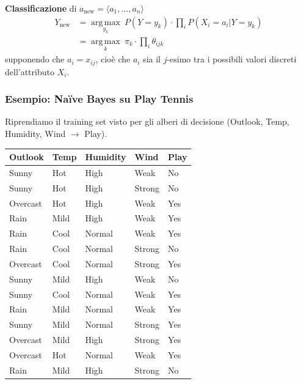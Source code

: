 \documentclass[a4paper,12pt]{article}
\newcommand{\argmax}{\operatorname*{arg\,max}}
\newlength{\figgap}
\newcommand{\figura}[1]{%
  \par\addvspace{\figgap}%
  {\centering\noindent#1\par}%
  \addvspace{\figgap}%
  \noindent\ignorespaces
}
\begin{document}
\textbf{Classificazione} di $a_{\text{new}} = \langle a_1,\dots,a_n\rangle$
\begin{align*}
    Y_{\text{new}} &= \argmax_{y_k}\ P(Y=y_k)\cdot \prod_i P(X_i=a_i|Y=y_k)\\
    &= \argmax_{k}\ \pi_k \cdot \prod_i \theta_{ijk}
\end{align*}
supponendo che $a_i = x_{ij}$, cioè che $a_i$ sia il $j$-esimo tra i possibili valori discreti dell'attributo $X_i$.

\subsubsection{Esempio: Naïve Bayes su Play Tennis}
Riprendiamo il training set visto per gli alberi di decisione (Outlook, Temp, Humidity, Wind $\to$ Play).
\figura{%
  \begin{tabular}{|l|l|l|l|l|}
    \hline
    Outlook  & Temp & Humidity & Wind   & Play \\
    \hline
    Sunny    & Hot  & High     & Weak   & No  \\
    \hline
    Sunny    & Hot  & High     & Strong & No  \\
    \hline
    Overcast & Hot  & High     & Weak   & Yes \\
    \hline
    Rain     & Mild & High     & Weak   & Yes \\
    \hline
    Rain     & Cool & Normal   & Weak   & Yes \\
    \hline
    Rain     & Cool & Normal   & Strong & No  \\
    \hline
    Overcast & Cool & Normal   & Strong & Yes \\
    \hline
    Sunny    & Mild & High     & Weak   & No  \\
    \hline
    Sunny    & Cool & Normal   & Weak   & Yes \\
    \hline
    Rain     & Mild & Normal   & Weak   & Yes \\
    \hline
    Sunny    & Mild & Normal   & Strong & Yes \\
    \hline
    Overcast & Mild & High     & Strong & Yes \\
    \hline
    Overcast & Hot  & Normal   & Weak   & Yes \\
    \hline
    Rain     & Mild & High     & Strong & No  \\
    \hline
  \end{tabular}%
}
\end{document}

